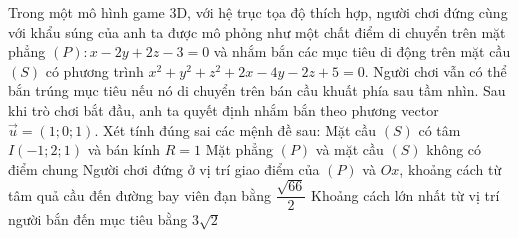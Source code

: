 \begin{ex}
	Trong một mô hình game 3D, với hệ trục tọa độ thích hợp, người chơi đứng cùng với khẩu súng của anh ta được mô phỏng như một chất điểm di chuyển trên mặt phẳng $(P): x - 2y + 2z - 3 = 0$ và nhắm bắn các mục tiêu di động trên mặt cầu $(S)$ có phương trình $x^2 + y^2 + z^2 +2x - 4y - 2z + 5 = 0$. Người chơi vẫn có thể bắn trúng mục tiêu nếu nó di chuyển trên bán cầu khuất phía sau tầm nhìn. Sau khi trò chơi bắt đầu, anh ta quyết định nhắm bắn theo phương vector $\vec{u} = (1; 0; 1)$.
	Xét tính đúng sai các mệnh đề sau:
	\choiceTF
	{\True Mặt cầu $(S)$ có tâm $I(-1; 2; 1)$ và bán kính $R = 1$}
	{\True Mặt phẳng $(P)$ và mặt cầu $(S)$ không có điểm chung}
	{\True Người chơi đứng ở vị trí giao điểm của $(P)$ và $Ox$, khoảng cách từ tâm quả cầu đến đường bay viên đạn bằng $\dfrac{\sqrt{66}}{2}$}
	{\True Khoảng cách lớn nhất từ vị trí người bắn đến mục tiêu bằng $3\sqrt{2}$}
\end{ex}
